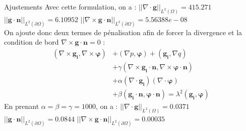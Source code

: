 \documentclass{beamer}
\newcommand{\grad}{{\nabla}}
\newcommand{\rot}{{\nabla\times}}
\renewcommand{\div}{{\nabla\cdot}}
\begin{document}
\begin{frame}{Ajustements}
Avec cette formulation, on a : $||\div\bm{g}||_{L^2(\Omega)}=415.271$  $||\bm{g}\cdot\bm{n}||_{L^2(\partial\Omega)}=6.10952$ $||\rot\bm{g}\cdot\bm{n}||_{L^2(\partial\Omega)}=5.56388e-08$\\

On ajoute donc deux termes de pénalisation afin de forcer la divergence et la condition de bord $\rot\bm{g}\cdot\bm{n} = 0$ :
\[\begin{aligned}
(\rot\bm{g_i},\rot\bm{\varphi}) &+ (\grad p, \bm{\varphi}) + (\bm{g_i}, \grad q)\\
&+ \gamma(\rot\bm{g_i}\cdot\bm{n},\rot\bm{\varphi}\cdot\bm{n})\\
&+ \alpha(\div\bm{g_i})(\div\bm{\varphi})\\
&+ \beta(\bm{g_i}\cdot\bm{n},\bm{\varphi}\cdot\bm{n}) = \lambda^2(\bm{g_i},\bm{\varphi})
\end{aligned}\]
En prenant $\alpha=\beta=\gamma=1000$, on a :
$||\div\bm{g}||_{L^2(\Omega)}=0.0371$  $||\bm{g}\cdot\bm{n}||_{L^2(\partial\Omega)}=0.0844$ $||\rot\bm{g}\cdot\bm{n}||_{L^2(\partial\Omega)}=0.00035$
\end{frame}
\end{document}

